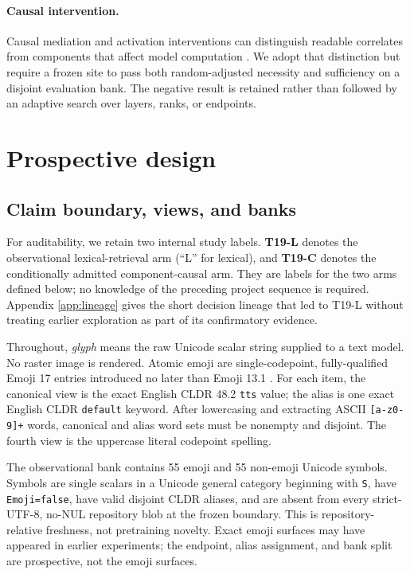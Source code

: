 \documentclass{article}
\begin{document}
\paragraph{Causal intervention.}
Causal mediation and activation interventions can distinguish readable
correlates from components that affect model computation
\citep{vig2020causal,meng2022rome,turner2023activation}. We adopt that
distinction but require a frozen site to pass both random-adjusted necessity
and sufficiency on a disjoint evaluation bank. The negative result is retained
rather than followed by an adaptive search over layers, ranks, or endpoints.

\section{Prospective design}
\label{sec:design}

\subsection{Claim boundary, views, and banks}

For auditability, we retain two internal study labels. \textbf{T19-L}
denotes the observational lexical-retrieval arm (``L'' for lexical), and
\textbf{T19-C} denotes the conditionally admitted component-causal arm.
They are labels for the two arms defined below; no knowledge of the preceding
project sequence is required. Appendix \ref{app:lineage} gives the short
decision lineage that led to T19-L without treating earlier exploration as
part of its confirmatory evidence.

Throughout, \emph{glyph} means the raw Unicode scalar string supplied to a
text model. No raster image is rendered. Atomic emoji are single-codepoint,
fully-qualified Emoji 17 entries introduced no later than Emoji 13.1
\citep{unicode2025emoji}. For each item, the canonical view is the exact
English CLDR 48.2 \texttt{tts} value; the alias is one exact English CLDR
\texttt{default} keyword. After lowercasing and extracting ASCII
\texttt{[a-z0-9]+} words, canonical and alias word sets must be nonempty and
disjoint. The fourth view is the uppercase literal codepoint spelling.

The observational bank contains 55 emoji and 55 non-emoji Unicode symbols.
Symbols are single scalars in a Unicode general category beginning with
\texttt{S}, have \texttt{Emoji=false}, have valid disjoint CLDR aliases, and
are absent from every strict-UTF-8, no-NUL repository blob at the frozen
boundary. This is repository-relative freshness, not pretraining novelty.
Exact emoji surfaces may have appeared in earlier experiments; the endpoint,
alias assignment, and bank split are prospective, not the emoji surfaces.
\end{document}
